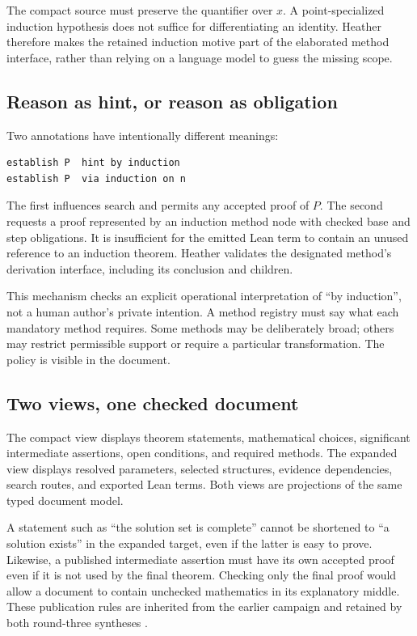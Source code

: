 \documentclass[11pt,letterpaper]{article}
\theoremstyle{definition}\newtheorem{definition}[theorem]{Definition}
\theoremstyle{remark}\newtheorem{remark}[theorem]{Remark}
\begin{document}
The compact source must preserve the quantifier over $x$. A point-specialized
induction hypothesis does not suffice for differentiating an identity. Heather
therefore makes the retained induction motive part of the elaborated method
interface, rather than relying on a language model to guess the missing scope.

\subsection{Reason as hint, or reason as obligation}
Two annotations have intentionally different meanings:
\par\noindent\begin{minipage}{\linewidth}
\begin{lstlisting}
establish P  hint by induction
establish P  via induction on n
\end{lstlisting}
\end{minipage}\par
The first influences search and permits any accepted proof of $P$. The second
requests a proof represented by an induction method node with checked base and
step obligations. It is insufficient for the emitted Lean term to contain an
unused reference to an induction theorem. Heather validates the designated
method's derivation interface, including its conclusion and children.

This mechanism checks an explicit operational interpretation of ``by
induction'', not a human author's private intention. A method registry must say
what each mandatory method requires. Some methods may be deliberately broad;
others may restrict permissible support or require a particular transformation.
The policy is visible in the document.

\subsection{Two views, one checked document}
The compact view displays theorem statements, mathematical choices, significant
intermediate assertions, open conditions, and required methods. The expanded
view displays resolved parameters, selected structures, evidence dependencies,
search routes, and exported Lean terms. Both views are projections of the same
typed document model.

A statement such as ``the solution set is complete'' cannot be shortened to
``a solution exists'' in the expanded target, even if the latter is easy to
prove. Likewise, a published intermediate assertion must have its own accepted
proof even if it is not used by the final theorem. Checking only the final proof
would allow a document to contain unchecked mathematics in its explanatory
middle. These publication rules are inherited from the earlier campaign and
retained by both round-three syntheses \cite{round3a,round3b}.
\end{document}
